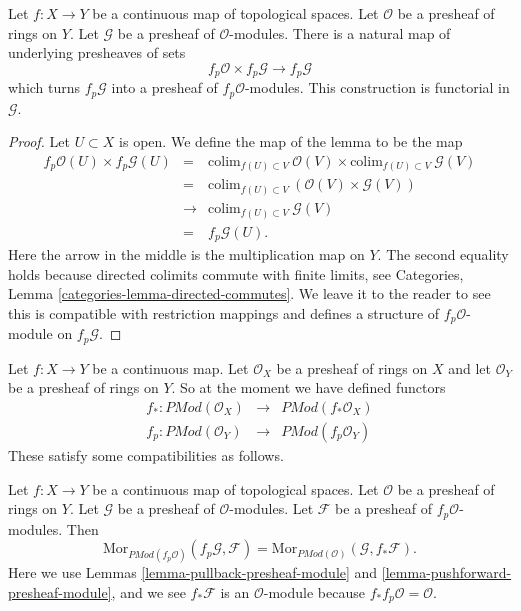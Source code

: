 \begin{lemma}
\label{lemma-pullback-presheaf-module}
Let $f : X \to Y$ be a continuous map of topological spaces.
Let $\mathcal{O}$ be a presheaf of rings on $Y$. Let
$\mathcal{G}$ be a presheaf of $\mathcal{O}$-modules.
There is a natural map of underlying presheaves of sets
$$
f_p\mathcal{O} \times f_p\mathcal{G}
\longrightarrow
f_p\mathcal{G}
$$
which turns $f_p\mathcal{G}$ into a presheaf of $f_p\mathcal{O}$-modules.
This construction is functorial in $\mathcal{G}$.
\end{lemma}

\begin{proof}
Let $U \subset X$ is open. We define the map of the lemma
to be the map
\begin{eqnarray*}
f_p\mathcal{O}(U) \times f_p\mathcal{G}(U)
& = &
\text{colim}_{f(U) \subset V}\ \mathcal{O}(V)
\times 
\text{colim}_{f(U) \subset V}\ \mathcal{G}(V) \\
& = &
\text{colim}_{f(U) \subset V}\ (\mathcal{O}(V)\times \mathcal{G}(V)) \\
& \to &
\text{colim}_{f(U) \subset V}\ \mathcal{G}(V) \\
& = &
f_p\mathcal{G}(U).
\end{eqnarray*}
Here the arrow in the middle is the multiplication map on $Y$.
The second equality holds because directed colimits commute
with finite limits, see
Categories, Lemma \ref{categories-lemma-directed-commutes}.
We leave it to the reader to see this is compatible with
restriction mappings and defines a structure of
$f_p\mathcal{O}$-module on $f_p\mathcal{G}$.
\end{proof}

\noindent
Let $f : X \to Y$ be a continuous map.
Let $\mathcal{O}_X$ be a presheaf of rings on $X$ and
let $\mathcal{O}_Y$ be a presheaf of rings on $Y$.
So at the moment we have defined functors
\begin{eqnarray*}
f_* : \textit{PMod}(\mathcal{O}_X) &
\longrightarrow &
\textit{PMod}(f_*\mathcal{O}_X) \\
f_p : \textit{PMod}(\mathcal{O}_Y) &
\longrightarrow &
\textit{PMod}(f_p\mathcal{O}_Y)
\end{eqnarray*}
These satisfy some compatibilities as follows.

\begin{lemma}
\label{lemma-adjoint-push-pull-presheaves-modules}
Let $f : X \to Y$ be a continuous map of topological spaces.
Let $\mathcal{O}$ be a presheaf of rings on $Y$.
Let $\mathcal{G}$ be a presheaf of $\mathcal{O}$-modules.
Let $\mathcal{F}$ be a presheaf of $f_p\mathcal{O}$-modules.
Then
$$
\text{Mor}_{\textit{PMod}(f_p\mathcal{O})}(f_p\mathcal{G}, \mathcal{F})
=
\text{Mor}_{\textit{PMod}(\mathcal{O})}(\mathcal{G}, f_*\mathcal{F}).
$$
Here we use
Lemmas \ref{lemma-pullback-presheaf-module}
and \ref{lemma-pushforward-presheaf-module}, and we see
$f_*\mathcal{F}$ is an $\mathcal{O}$-module because
$f_*f_p\mathcal{O} = \mathcal{O}$.
\end{lemma}

